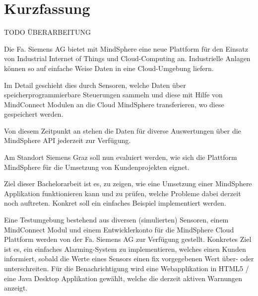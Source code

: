 \chapter{Kurzfassung}


TODO ÜBERARBEITUNG
\vspace{\baselineskip}
\vspace{\baselineskip}


Die Fa. Siemens AG bietet mit MindSphere eine neue Plattform für den Einsatz von Industrial Internet of Things und Cloud-Computing an. Industrielle Anlagen können so auf einfache Weise Daten in eine Cloud-Umgebung liefern. 

Im Detail geschieht dies durch Sensoren, welche Daten über speicherprogrammierbare Steuerungen sammeln und diese mit Hilfe von MindConnect Modulen an die Cloud MindSphere transferieren, wo diese gespeichert werden. 

Von diesem Zeitpunkt an stehen die Daten für diverse Auswertungen über die MindSphere API jederzeit zur Verfügung. 

Am Standort Siemens Graz soll nun evaluiert werden, wie sich die Plattform MindSphere für die Umsetzung von Kundenprojekten eignet. 

Ziel dieser Bachelorarbeit ist es, zu zeigen, wie eine Umsetzung einer MindSphere Applikation funktionieren kann und zu prüfen, welche Probleme dabei derzeit noch auftreten. Konkret soll ein einfaches Beispiel implementiert werden. 

Eine Testumgebung bestehend aus diversen (simulierten) Sensoren, einem MindConnect Modul und einem Entwicklerkonto für die MindSphere Cloud Plattform werden von der Fa. Siemens AG zur Verfügung gestellt. Konkretes Ziel ist es, ein einfaches Alarming-System zu implementieren, welches einen Kunden informiert, sobald die Werte eines Sensors einen fix vorgegebenen Wert über- oder unterschreiten. Für die Benachrichtigung wird eine Webapplikation in HTML5 / eine Java Desktop Applikation gewählt, welche die derzeit aktiven Warnungen anzeigt.
